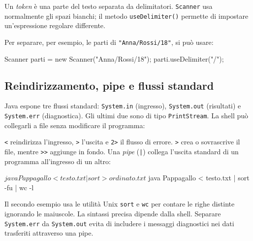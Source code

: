 Un \emph{token} è una parte del testo separata da delimitatori.
\texttt{Scanner} usa normalmente gli spazi bianchi; il metodo
\texttt{useDelimiter()} permette di impostare un'espressione
regolare differente.



Per separare, per esempio, le parti di
\texttt{"Anna/Rossi/18"}, si può usare:

\begin{unipdcode}[language=Java]
Scanner parti = new Scanner("Anna/Rossi/18");
parti.useDelimiter("/");
\end{unipdcode}

\clearpage

\subsection{Reindirizzamento, pipe e flussi standard}
\label{sec:fi-java-file-redirezione}

Java espone tre flussi standard: \texttt{System.in} (ingresso),
\texttt{System.out} (risultati) e \texttt{System.err}
(diagnostica). Gli ultimi due sono di tipo \texttt{PrintStream}.
La shell può collegarli a file senza modificare il programma:




\texttt{<} reindirizza l'ingresso, \texttt{>} l'uscita e
\texttt{2>} il flusso di errore. \texttt{>} crea o sovrascrive
il file, mentre \verb|>>| aggiunge in fondo. Una \emph{pipe}
(\texttt{|})
collega l'uscita standard di un programma all'ingresso di un altro:

\begin{unipdterminal}
$ java Pappagallo < testo.txt | sort > ordinato.txt
$ java Pappagallo < testo.txt | sort -fu | wc -l
\end{unipdterminal}

Il secondo esempio usa le utilità Unix \texttt{sort} e \texttt{wc}
per contare le righe distinte ignorando le maiuscole. La sintassi
precisa dipende dalla shell. Separare \texttt{System.err} da
\texttt{System.out} evita di includere i messaggi diagnostici
nei dati trasferiti attraverso una pipe.
